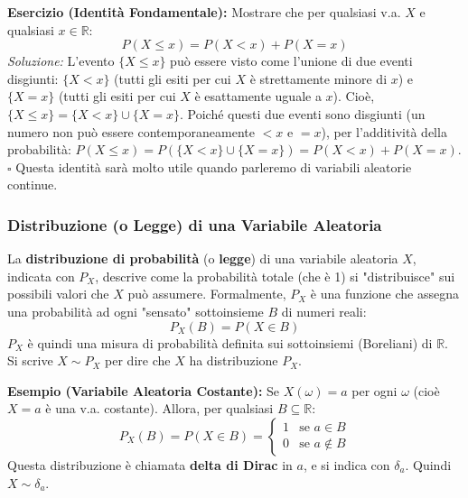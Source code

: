 \begin{exercise}
\textbf{Esercizio (Identità Fondamentale):}
Mostrare che per qualsiasi v.a. $X$ e qualsiasi $x \in \mathbb{R}$:
\[ P(X \le x) = P(X < x) + P(X = x) \]
\textit{Soluzione:}
L'evento $\{X \le x\}$ può essere visto come l'unione di due eventi disgiunti:
$\{X < x\}$ (tutti gli esiti per cui $X$ è strettamente minore di $x$) e
$\{X = x\}$ (tutti gli esiti per cui $X$ è esattamente uguale a $x$).
Cioè, $\{X \le x\} = \{X < x\} \cup \{X = x\}$.
Poiché questi due eventi sono disgiunti (un numero non può essere contemporaneamente $<x$ e $=x$), per l'additività della probabilità:
$P(X \le x) = P(\{X < x\} \cup \{X = x\}) = P(X < x) + P(X = x)$. $\square$
Questa identità sarà molto utile quando parleremo di variabili aleatorie continue.
\end{exercise}

\subsubsection{Distribuzione (o Legge) di una Variabile Aleatoria}
\begin{definition}
La \textbf{distribuzione di probabilità} (o \textbf{legge}) di una variabile aleatoria $X$, indicata con $P_X$, descrive come la probabilità totale (che è 1) si "distribuisce" sui possibili valori che $X$ può assumere.
Formalmente, $P_X$ è una funzione che assegna una probabilità ad ogni "sensato" sottoinsieme $B$ di numeri reali:
\[ P_X(B) = P(X \in B) \]
$P_X$ è quindi una misura di probabilità definita sui sottoinsiemi (Boreliani) di $\mathbb{R}$. Si scrive $X \sim P_X$ per dire che $X$ ha distribuzione $P_X$.
\end{definition}

\begin{example}
\textbf{Esempio (Variabile Aleatoria Costante):}
Se $X(\omega) = a$ per ogni $\omega$ (cioè $X=a$ è una v.a. costante).
Allora, per qualsiasi $B \subseteq \mathbb{R}$:
\[ P_X(B) = P(X \in B) = \begin{cases} 1 & \text{se } a \in B \\ 0 & \text{se } a \notin B \end{cases} \]
Questa distribuzione è chiamata \textbf{delta di Dirac} in $a$, e si indica con $\delta_a$. Quindi $X \sim \delta_a$.
\end{example}


